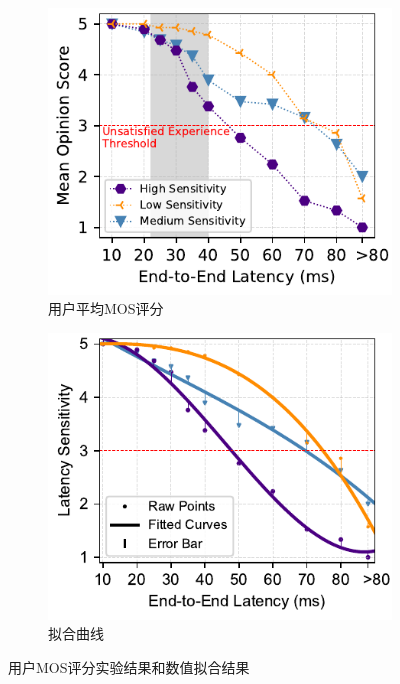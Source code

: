 \begin{figure}[ht]
\centering
\begin{subfigure}[t]{0.49\linewidth}
  \centering
  \includegraphics[width=\linewidth]{figures/chap03/latency_curve/user_perception.pdf}
  \caption{用户平均MOS评分}
  \label{fig-average-user-mos-rating}
\end{subfigure}%
\begin{subfigure}[t]{0.49\linewidth}
  \centering
  \includegraphics[width=\linewidth]{figures/chap03/latency_curve/fitted_curve.pdf}
  \caption{拟合曲线}
  \label{fig-fitted-curves}
\end{subfigure}

\caption{用户MOS评分实验结果和数值拟合结果}
\label{fig-latency-curve}
\end{figure}
